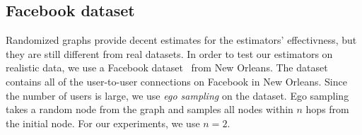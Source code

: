 \subsection{Facebook dataset}

Randomized graphs provide decent estimates for the estimators' effectivness, but they are still different from real datasets. In order to test our estimators on realistic data, we use a Facebook dataset~\cite{viswanath-2009-activity} from New Orleans. The dataset contains all of the user-to-user connections on Facebook in New Orleans. Since the number of users is large, we use \emph{ego sampling} on the dataset. Ego sampling takes a random node from the graph and samples all nodes within $n$ hops from the initial node. For our experiments, we use $n = 2$.
